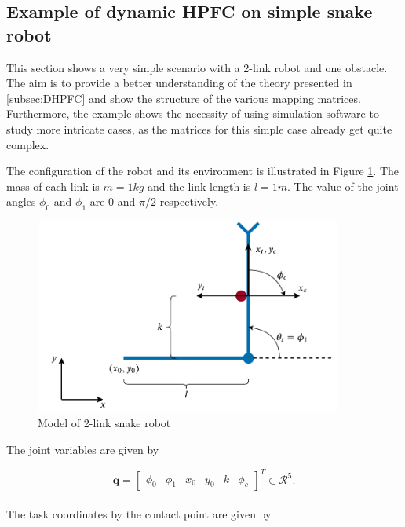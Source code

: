 
\subsection{Example of dynamic HPFC on simple snake robot}

This section shows a very simple scenario with a 2-link robot and one obstacle. The aim is to provide a better understanding of the theory presented in \ref{subsec:DHPFC} and show the structure of the various mapping matrices.
Furthermore, the example shows the necessity of using simulation software to study more intricate cases, as the matrices for this simple case already get quite complex.

The configuration of the robot and its environment is illustrated in Figure \ref{fig:ex_2link}. %
The mass of each link is $m = 1 kg$ and the link length is $l=1 m$. The value of the joint angles $\phi_0$ and $\phi_1$ are $0$ and $\pi/2$ respectively.

\begin{figure}
    \centering
    \includegraphics[width=0.9\textwidth]{figures/theory/example_2link.pdf}
    \caption{Model of 2-link snake robot}
    \label{fig:ex_2link}
\end{figure}

The joint variables are given by

\begin{equation}
    \mathbf{q} =
    \begin{bmatrix}
        \phi_0 & \phi_1 & x_0 & y_0 & k & \phi_c
    \end{bmatrix}^T \in \mathcal{R}^5.
\end{equation}
\\
The task coordinates by the contact point are given by

